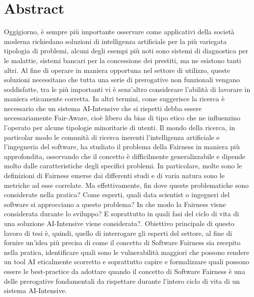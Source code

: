 \chapter*{Abstract}
Oggigiorno, è sempre più importante osservare come applicativi della società moderna richiedano soluzioni di intelligenza artificiale per la più variegata tipologia di problemi, alcuni degli esempi più noti sono sistemi di diagnostica per le malattie, sistemi bancari per la concessione dei prestiti, ma ne esistono tanti altri. Al fine di operare in maniera opportuna nel settore di utilizzo, queste soluzioni necessitano che tutta una serie di prerogative non funzionali vengano soddisfatte, tra le più importanti vi è senz'altro considerare l'abilità di lavorare in maniera eticamente corretta. In altri termini, come suggerisce la ricerca è necessario che un sistema AI-Intensive che si rispetti debba essere necessariamente Fair-Aware, cioè libero da bias di tipo etico che ne influenzino l'operato per alcune tipologie minoritarie di utenti. Il mondo della ricerca, in particolar modo le comunità di ricerca inerenti l'intelligenza artificiale e l'ingegneria del software, ha studiato il problema della Fairness in maniera più approfondita, osservando che il concetto è difficilmente generalizzabile e dipende molto dalle caratteristiche degli specifici problemi. In particolare, molte sono le definizioni di Fairness emerse dai differenti studi e di varia natura sono le metriche ad esse correlate. Ma effettivamente, fin dove queste problematiche sono considerate nella pratica? Come  esperti, quali data scientist o ingegneri del software si approcciano a questo problema? In che modo la Fairness viene considerata durante lo sviluppo? E soprattutto in quali fasi del ciclo di vita di una soluzione AI-Intensive viene considerata?. Obiettivo principale di questo lavoro di tesi è, quindi, quello di interrogare gli esperti del settore, al fine di fornire un'idea più precisa di come il concetto di Software Fairness sia recepito nella pratica, identificare quali sono le vulnerabilità maggiori che possono rendere un tool AI eticalmente scorretto e soprattutto capire e formalizzare quali possono essere le best-practice da adottare quando il concetto di Software Fairness è una delle prerogative fondamentali da rispettare durante l'intero ciclo di vita di un sistema AI-Intensive.
